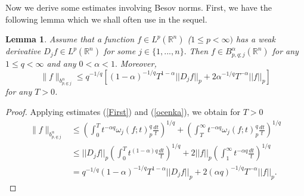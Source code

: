 \documentclass[12pt,twoside,reqno]{amsart}
\numberwithin{equation}{section}
\newtheorem{lem}[teo]{Lemma}
\theoremstyle{definition}
\numberwithin{equation}{section}
\begin{document}
Now we derive some estimates involving Besov norms. First, we have the following  lemma which we shall often use in the sequel.
\begin{lem}\label{partition} Assume that a function $f\in L^p({\mathbb{R}}^n)$ ($1\le p<\infty)$ has a weak derivative $D_jf\in L^p({\mathbb{R}}^n)$ for some  $j\in \{1,...,n\}.$
Then $f\in B_{p,q;j}^{\alpha}({\mathbb{R}}^n)$ for any $1\le q<\infty$ and any $0<{\alpha}<1.$ Moreover,
$$
\|f\|_{b^{\alpha}_{p,q;j}}
\le q^{-1/q}\left[(1-{\alpha})^{-1/q}T^{1-{\alpha}}||D_jf||_p+2{\alpha}^{-1/q}T^{-{\alpha} }||f||_p\right]
$$
for any $T>0$.
\end{lem}
\begin{proof} Applying estimates (\ref{First}) and (\ref{ocenka}), we obtain for $T>0$
$$
\begin{aligned}
\|f\|_{b^{\alpha}_{p,q;j}}&\le \left(\int_0^T t^{-{\alpha} q}{\omega}_j(f;t)_p^q\frac{dt}{t}\right)^{1/q}
+\left(\int_T^\infty t^{-{\alpha} q}{\omega}_j(f;t)_p^q\frac{dt}{t}\right)^{1/q}\\
&\le ||D_j f||_p\left(\int_0^T t^{(1-{\alpha})q}\frac{dt}{t}\right)^{1/q}
+2||f||_p\left(\int_1^\infty t^{-{\alpha} q}\frac{dt}{t}\right)^{1/q}\\
&=q^{-1/q}(1-{\alpha})^{-1/q}T^{1-{\alpha}}||D_jf||_p+2({\alpha} q)^{-1/q}T^{-{\alpha}}||f||_p.
\end{aligned}
$$
\end{proof}
\end{document}

